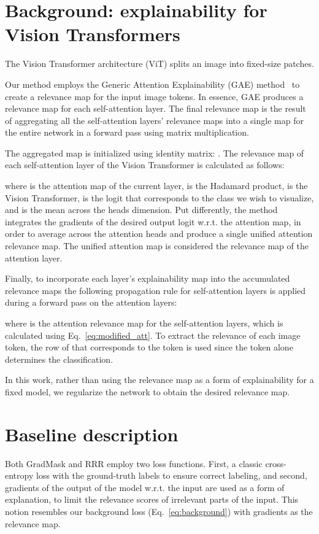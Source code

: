 \documentclass{article}
\begin{document}
\clearpage

\section{Background: explainability for Vision Transformers}
\label{sec:background}
The Vision Transformer architecture (ViT) splits an image  into  fixed-size patches.

Our method employs the Generic Attention Explainability (GAE) method~\cite{Chefer_2021_ICCV} to create a relevance map for the input image tokens. In essence, GAE produces a relevance map  for each self-attention layer. The final relevance map is the result of aggregating all the self-attention layers' relevance maps into a single map  for the entire network in a forward pass using matrix multiplication.

The aggregated map is initialized using identity matrix: .  The relevance map of each self-attention layer of the Vision Transformer is calculated as follows:

 
 where  is the attention map of the current layer,  is the Hadamard product,  is the Vision Transformer,  is the logit that corresponds to the class we wish to visualize, and  is the mean across the heads dimension. Put differently, the method integrates the gradients of the desired output logit w.r.t. the attention map, in order to average across the attention heads and produce a single unified attention relevance map. The unified attention map  is considered the relevance map of the attention layer. 

Finally, to incorporate each layer's explainability map into the accumulated relevance maps the following propagation rule for self-attention layers is applied during a forward pass on the attention layers:

where  is the attention relevance map for the self-attention layers, which is calculated using Eq.~\ref{eq:modified_att}. To extract the relevance of each image token, the row of  that corresponds to the  token is used since the  token alone determines the classification.

In this work, rather than using the relevance map as a form of explainability for a fixed model, we regularize the network to obtain the desired relevance map.

\clearpage

\section{Baseline description}
\label{sec:baselines}
Both GradMask and RRR employ two loss functions. First, a classic cross-entropy loss with the ground-truth labels to ensure correct labeling, and second, gradients of the output of the model w.r.t. the input are used as a form of explanation, to limit the relevance scores of irrelevant parts of the input. This notion resembles our background loss (Eq.~\ref{eq:background}) with gradients as the relevance map.
\end{document}
